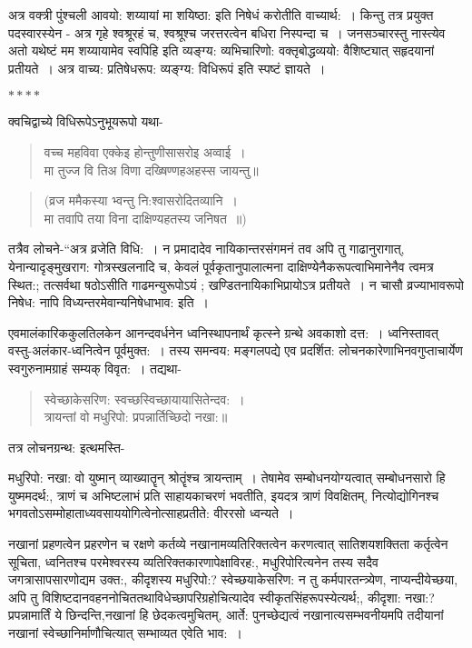 {अत्र वक्त्री पुंश्चली आवयो: शय्यायां मा शयिष्ठा: इति निषेधं करोतीति वाच्यार्थ:~। किन्तु तत्र प्रयुक्त पदस्वारस्येन - अत्र गृहे श्वश्रूरहं च, श्वश्रूश्च जरत्तरत्वेन बधिरा निस्पन्दा च~। जनसञ्चारस्तु नास्त्येव अतो यथेष्टं मम शय्यायामेव स्वपिहि इति व्यङ्ग्य: व्यभिचारिणो: वक्तृबोद्धव्ययो: वैशिष्ट्यात् सहृदयानां प्रतीयते~। अत्र वाच्य: प्रतिषेधरूप: व्यङ्ग्य: विधिरूपं इति स्पष्टं ज्ञायते~। 

$****$

क्वचिद्वाच्ये विधिरूपेऽनुभूयरूपो यथा-
\begin{verse}
वच्च महविवा एक्केइ होन्तुणीसासरोइ अव्वाई~। \\
मा तुज्ज वि तिअ विणा दख्षिण्णहअहस्स जायन्तु॥
\end{verse}
\begin{verse}
(व्रज ममैकस्या भ्वन्तु नि:श्वासरोदितव्यानि~। \\
मा तवापि तया विना दाक्षिण्यहतस्य जनिषत~॥)
\end{verse}
तत्रैव लोचने-“अत्र व्रजेति विधि:~। न प्रमादादेव नायिकान्तरसंगमनं तव अपि तु गाढानुरागात्, येनान्यादृङ्मुखराग: गोत्रस्खलनादि च, केवलं पूर्वकृतानुपालात्मना दाक्षिण्येनैकरूपत्वाभिमानेनैव त्वमत्र स्थित:; तत्सर्वथा षठोऽसीति गाढमन्युरूपोऽयं ; खण्डितनायिकाभिप्रायोऽत्र प्रतीयते~। न चासौ व्रज्याभावरूपो निषेध: नापि विध्यन्तरमेवान्यनिषेधाभाव: इति~। 

एवमालंकारिककुलतिलकेन आनन्दवर्धनेन ध्वनिस्थापनार्थं कृत्स्ने ग्रन्थे अवकाशो दत्त:~। ध्वनिस्तावत् वस्तु-अलंकार-ध्वनित्वेन पूर्वमुक्त:~। तस्य समन्वय: मङ्गलपद्ये एव प्रदर्शित: लोचनकारेणाभिनवगुप्ताचार्येण स्वगुरुनामग्राहं सम्यक् विवृत:~। तद्यथा-
\begin{verse}
स्वेच्छाकेसरिण: स्वच्छस्विच्छायायासितेन्दव:~। \\
त्रायन्तां वो मधुरिपो: प्रपन्नार्तिच्छिदो नखा:॥
\end{verse}
तत्र लोचनग्रन्थ: इत्थमस्ति-

मधुरिपो: नखा: वो युष्मान् व्याख्यातॄन् श्रोतॄंश्च त्रायन्ताम्~। तेषामेव सम्बोधनयोग्यत्वात् सम्बोधनसारो हि युष्ममदर्थ:, त्राणं च अभिष्टलाभं प्रति साहायकाचरणं भवतीति, इयदत्र त्राणं विवक्षितम्, नित्योद्योगिनश्च भगवतोऽसम्मोहाताध्यवसाययोगित्वेनोत्साहप्रतीते: वीररसो ध्वन्यते~। 

नखानां प्रहणत्वेन प्रहरणेन च रक्षणे कर्तव्ये नखानामव्यतिरिक्तत्वेन करणत्वात् साति\-शयशक्तिता कर्तृत्वेन सूचिता, ध्वनितश्च परमेश्वरस्य व्यतिरिक्तकारणापेक्षाविरह:, मधुरिपोरित्यनेन तस्य सदैव जगत्रासापसारणोद्यम उक्त:, कीदृशस्य मधुरिपो:? स्वेच्छया\break केसरिण: न तु कर्मपारतन्त्र्येण, नाप्यन्दीयेच्छया, अपि तु विशिष्टदानवहननोचिततथावि\-धेच्छापरिग्रहोचित्यादेव स्वीकृतसिंहरूपस्येत्यर्थ;, कीदृशा: नखा:? प्रपन्नामार्तिं ये छिन्दन्ति,\break नखानां हि छेदकत्वमुचितम्, आर्ते: पुनच्छेद्यत्वं नखानात्यसम्भवनीयमपि तदीयानां नखानां स्वेच्छानिर्माणौचित्यात् सम्भाव्यत एवेति भाव:~। 

}
